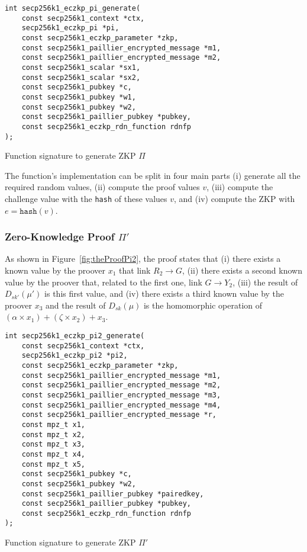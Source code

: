 \begin{listing}
  \begin{verbatim}
int secp256k1_eczkp_pi_generate(
    const secp256k1_context *ctx,
    secp256k1_eczkp_pi *pi,
    const secp256k1_eczkp_parameter *zkp,
    const secp256k1_paillier_encrypted_message *m1,
    const secp256k1_paillier_encrypted_message *m2,
    const secp256k1_scalar *sx1,
    const secp256k1_scalar *sx2,
    const secp256k1_pubkey *c,
    const secp256k1_pubkey *w1,
    const secp256k1_pubkey *w2,
    const secp256k1_paillier_pubkey *pubkey,
    const secp256k1_eczkp_rdn_function rdnfp
);
  \end{verbatim}
	\caption{Function signature to generate ZKP $\Pi$}
	\label{lst:funcSigGeneratePi}
\end{listing}

The function's implementation can be split in four main parts (i) generate all
the required random values, (ii) compute the proof values $v$, (iii) compute
the challenge value with the \texttt{hash} of these values $v$, and (iv) compute
the ZKP with $e = \texttt{hash}(v)$.

\subsubsection{Zero-Knowledge Proof $\Pi'$}

As shown in Figure~\ref{fig:theProofPi2}, the proof states that (i) there exists a
known value by the proover $x_1$ that link $R_2 \rightarrow G$, (ii) there exists a
second known value by the proover that, related to the first one, link $G
\rightarrow Y_2$, (iii) the result of $D_{sk'}(\mu')$ is this first value, and
(iv) there exists a third known value by the proover $x_3$ and the result of
$D_{sk}(\mu)$ is the homomorphic operation of $(\alpha \times x_1) + (\zeta
\times x_2) + x_3$.

\begin{listing}
  \begin{verbatim}
int secp256k1_eczkp_pi2_generate(
    const secp256k1_context *ctx,
    secp256k1_eczkp_pi2 *pi2,
    const secp256k1_eczkp_parameter *zkp,
    const secp256k1_paillier_encrypted_message *m1,
    const secp256k1_paillier_encrypted_message *m2,
    const secp256k1_paillier_encrypted_message *m3,
    const secp256k1_paillier_encrypted_message *m4,
    const secp256k1_paillier_encrypted_message *r,
    const mpz_t x1,
    const mpz_t x2,
    const mpz_t x3,
    const mpz_t x4,
    const mpz_t x5,
    const secp256k1_pubkey *c,
    const secp256k1_pubkey *w2,
    const secp256k1_paillier_pubkey *pairedkey,
    const secp256k1_paillier_pubkey *pubkey,
    const secp256k1_eczkp_rdn_function rdnfp
);
  \end{verbatim}
	\caption{Function signature to generate ZKP $\Pi'$}
	\label{lst:funcSigGeneratePi2}
\end{listing}

